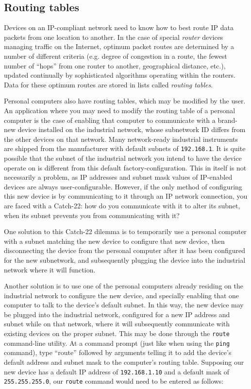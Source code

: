 \filbreak
\subsection{Routing tables}

Devices on an IP-compliant network need to know how to best route IP data packets from one location to another.  In the case of special \textit{router} devices managing traffic on the Internet, optimum packet routes are determined by a number of different criteria (e.g. degree of congestion in a route, the fewest number of ``hops'' from one router to another, geographical distance, etc.), updated continually by sophisticated algorithms operating within the routers.  Data for these optimum routes are stored in lists called \textit{routing tables}.

Personal computers also have routing tables, which may be modified by the user.  An application where you may need to modify the routing table of a personal computer is the case of enabling that computer to communicate with a brand-new device installed on the industrial network, whose subnetwork ID differs from the other devices on that network.  Many network-ready industrial instruments are shipped from the manufacturer with default subnets of \texttt{192.168.1}.  It is quite possible that the subnet of the industrial network you intend to have the device operate on is different from this default factory-configuration.  This in itself is not necessarily a problem, as IP addresses and subnet mask values of IP-enabled devices are always user-configurable.  However, if the only method of configuring this new device is by communicating to it through an IP network connection, you are faced with a Catch-22: how do you communicate with it to alter its subnet, when its subnet prevents you from communicating with it?

\vskip 10pt

One solution to this Catch-22 dilemma is to temporarily use a personal computer with a subnet matching the new device to configure that new device, then disconnecting the device from the personal computer after it has been configured for the new subnetwork, and subsequently plugging the device into the industrial network where it will function.

Another solution is to use one of the personal computers already residing on the industrial network to configure the new device, and specially enabling that one computer to talk to the device's default subnet.  In this way, the new device may be plugged into the industrial network, configured for a new IP address and subnet while on that network, where it will subsequently communicate with existing devices on the proper subnet.  This may be done through the \texttt{route} command-line utility.  At a command prompt (just like when using the \texttt{ping} command), type ``route'' followed by arguments telling it to add the device's default address and subnet mask to the computer's routing table.  Supposing our new device has a default IP address of \texttt{192.168.1.10} and a default mask of \texttt{255.255.255.0}, our \texttt{route} command would need to be entered as follows:


